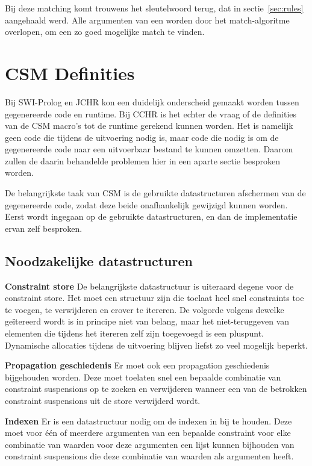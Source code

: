 Bij deze matching komt trouwens het sleutelwoord  terug, dat in sectie~\ref{sec:rules} aangehaald werd. Alle argumenten van een  worden door het match-algoritme overlopen, om een zo goed mogelijke match te vinden.

\section{CSM Definities} \label{sec:csmdef}

Bij SWI-Prolog en JCHR kon een duidelijk onderscheid gemaakt worden tussen gegenereerde code en runtime. Bij CCHR is het echter de vraag of de definities van de CSM macro's tot de runtime gerekend kunnen worden. Het is namelijk geen code die tijdens de uitvoering nodig is, maar code die nodig is om de gegenereerde code naar een uitvoerbaar bestand te kunnen omzetten. Daarom zullen de daarin behandelde problemen hier in een aparte sectie besproken worden.

De belangrijkste taak van CSM is de gebruikte datastructuren afschermen van de gegenereerde code, zodat deze beide onafhankelijk gewijzigd kunnen worden. Eerst wordt ingegaan op de gebruikte datastructuren, en dan de implementatie ervan zelf besproken.

\subsection{Noodzakelijke datastructuren} \label{sec:datastruct}

{\bf Constraint store} De belangrijkste datastructuur is uiteraard degene voor de constraint store. Het moet een structuur zijn die toelaat heel snel constraints toe te voegen, te verwijderen en erover te itereren. De volgorde volgens dewelke ge\"itereerd wordt is in principe niet van belang, maar het niet-teruggeven van elementen die tijdens het itereren zelf zijn toegevoegd is een pluspunt. Dynamische allocaties tijdens de uitvoering blijven liefst zo veel mogelijk beperkt.

{\bf Propagation geschiedenis} Er moet ook een propagation geschiedenis bijgehouden worden. Deze moet toelaten snel een bepaalde combinatie van constraint suspensions op te zoeken en verwijderen wanneer een van de betrokken constraint suspensions uit de store verwijderd wordt.

{\bf Indexen} Er is een datastructuur nodig om de indexen in bij te houden. Deze moet voor \'e\'en of meerdere argumenten van een bepaalde constraint voor elke combinatie van waarden voor deze argumenten een lijst kunnen bijhouden van constraint suspensions die deze combinatie van waarden als argumenten heeft.
 
